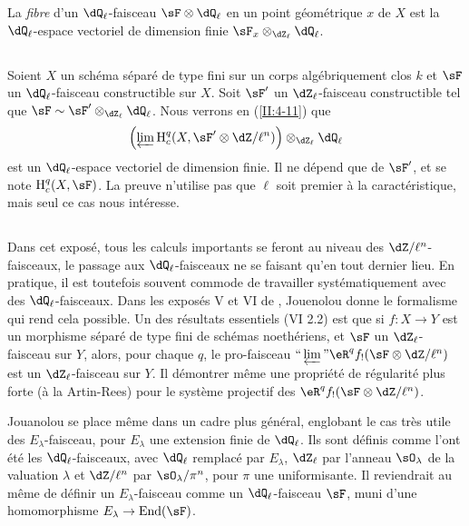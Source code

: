 La \emph{fibre} d'un $\dQ_\ell$-faisceau $\sF\otimes\dQ_\ell$ en un point 
géométrique $x$ de $X$ est la $\dQ_\ell$-espace vectoriel de dimension 
finie $\sF_x\otimes_{\dZ_\ell}\dQ_\ell$. 





\subsection{}\label{II:2-10}

Soient $X$ un schéma séparé de type fini sur un corps algébriquement 
clos $k$ et $\sF$ un $\dQ_\ell$-faisceau constructible sur $X$. Soit $\sF'$ un 
$\dZ_\ell$-faisceau constructible tel que 
$\sF\sim \sF'\otimes_{\dZ_\ell}\dQ_\ell$. Nous verrons en (\ref{II:4-11}) que 
\[
  \left(\varprojlim \h_c^q(X,\sF'\otimes \dZ/\ell^n)\right)\otimes_{\dZ_\ell}\dQ_\ell
\]
est un $\dQ_\ell$-espace vectoriel de dimension finie. Il ne dépend que de 
$\sF'$, et se note $\h_c^q(X,\sF)$. La preuve n'utilise pas que $\ell$ soit 
premier à la caractéristique, mais seul ce cas nous intéresse. 





\subsection{}\label{II:2-11}

Dans cet exposé, tous les calculs importants se feront au niveau des 
$\dZ/\ell^n$-faisceaux, le passage aux $\dQ_\ell$-faisceaux ne se faisant qu'en 
tout dernier lieu. En pratique, il est toutefois souvent commode de travailler 
systématiquement avec des $\dQ_\ell$-faisceaux. Dans les exposés 
V et VI de \cite{sga5}, Jouenolou donne le formalisme qui rend cela possible. 
Un des résultats essentiels (VI 2.2) est que si $f:X\to Y$ est un morphisme 
séparé de type fini de schémas noethériens, et $\sF$ un 
$\dZ_\ell$-faisceau sur $Y$, alors, pour chaque $q$, le pro-faisceau 
$\text{``}\varprojlim\text{''}\eR^q f_! (\sF\otimes\dZ/\ell^n)$ est un 
$\dZ_\ell$-faisceau sur $Y$. Il démontrer même une propriété de 
régularité plus forte (à la Artin-Rees) pour le système projectif des 
$\eR^q f_!(\sF\otimes\dZ/\ell^n)$. 

Jouanolou se place même dans un cadre plus général, englobant le cas 
très utile des $E_\lambda$-faisceau, pour $E_\lambda$ une extension finie de 
$\dQ_\ell$. Ils sont définis comme l'ont été les $\dQ_\ell$-faisceaux, 
avec $\dQ_\ell$ remplacé par $E_\lambda$, $\dZ_\ell$ par l'anneau 
$\sO_\lambda$ de la valuation $\lambda$ et $\dZ/\ell^n$ par 
$\sO_\lambda/\pi^n$, pour $\pi$ une uniformisante. Il reviendrait au même de 
définir un $E_\lambda$-faisceau comme un $\dQ_\ell$-faisceau $\sF$, muni 
d'une homomorphisme $E_\lambda\to\operatorname{End}(\sF)$. 










